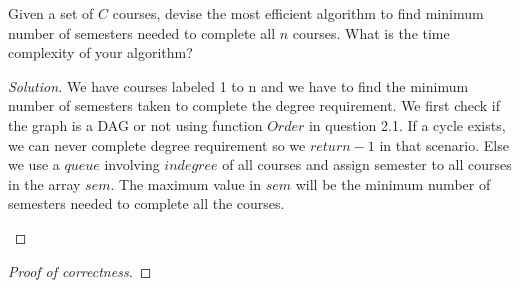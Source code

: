 \begin{solution}{2.2}
    \begin{question}
        Given a set of $C$ courses, devise the most efficient algorithm to find minimum number of semesters needed to complete all $n$ courses. What is the time complexity of your algorithm? 
    \end{question}
    \tcblower{}
    \begin{proof}[Solution]
        We have courses labeled 1 to n and we have to find the minimum number of semesters taken to complete the degree requirement. We first check if the graph is a DAG or not using function $Order$ in question 2.1. If a cycle exists, we can never complete degree requirement so we $return -1$ in that scenario. Else we use a $queue$ involving $indegree$ of all courses and assign semester to all courses in the array $sem$. The maximum value in $sem$ will be the minimum number of semesters needed to complete all the courses. 
        
        \begin{algorithm}[H]
        \caption{Least number of semesters for completion}
        \begin{algorithmic}
         
        \EndIf{}
         
         
            \EndFor{}
        \EndFor{}
        
          
            \EndIf{}
        \EndFor{}
        
             
                     
                \EndIf{}
            \EndFor{}
        \EndWhile{}
        \EndProcedure
        \end{algorithmic}
        \end{algorithm}
    \end{proof}
    \begin{proof}[Proof of correctness]
        

\end{proof}
\end{solution}
